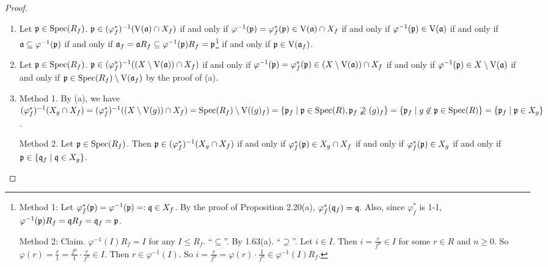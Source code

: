 \begin{proof}
    \begin{enumerate}
        \item Let $\mathfrak{p} \in \operatorname{Spec}(R_f)$. $\mathfrak{p} \in (\varphi_f^*)^{-1}(\operatorname{V}(\mathfrak{a}) \cap X_f)$ if and only if $\varphi^{-1}(\mathfrak{p}) = \varphi_f^*(\mathfrak{p}) \in \operatorname{V}(\mathfrak{a}) \cap X_f$ if and only if $\varphi^{-1}(\mathfrak{p}) \in \operatorname{V}(\mathfrak{a})$ if and only if $\mathfrak{a} \subseteq \varphi^{-1}(\mathfrak{p})$ if and only if $\mathfrak{a}_f = \mathfrak{a} R_f \subseteq \varphi^{-1}(\mathfrak{p})R_f = \mathfrak{p}$\footnote[2]{Method 1: Let $\varphi_f^*(\mathfrak{p}) = \varphi^{-1}(\mathfrak{p}) =: \mathfrak{q} \in X_f$. By the proof of Proposition 2.20(a), $\varphi_f^*(\mathfrak{q}_f) = \mathfrak{q}$. Also, since $\varphi_f^*$ is 1-1, $\varphi^{-1}(\mathfrak{p}) R_f = \mathfrak{q} R_f = \mathfrak{q}_f = \mathfrak{p}$. \par Method 2: Claim. $\varphi^{-1}(I)R_f = I$ for any $I \leq R_f$. ``$\subseteq$''. By 1.63(a). ``$\supseteq$''. Let $i \in I$. Then $i = \frac{r}{f^n} \in I$ for some $r \in R$ and $n \geq 0$. So $\varphi(r) = \frac{r}{1} = \frac{f^n}{1} \cdot \frac{r}{f^n} \in I$. Then $r \in \varphi^{-1}(I)$. So $i = \frac{r}{f^n} = \varphi(r) \cdot \frac{1}{f^n} \in \varphi^{-1}(I) R_f$.} if and only if $\mathfrak{p} \in \operatorname{V}(\mathfrak{a}_f)$.
        \item Let $\mathfrak{p} \in \operatorname{Spec}(R_f)$. $\mathfrak{p} \in (\varphi_f^*)^{-1}((X \setminus \operatorname{V}(\mathfrak{a})) \cap X_f)$ if and only if $\varphi^{-1}(\mathfrak{p}) = \varphi_f^*(\mathfrak{p}) \in (X \setminus \operatorname{V}(\mathfrak{a})) \cap X_f$ if and only if $\varphi^{-1}(\mathfrak{p}) \in X \setminus \operatorname{V}(\mathfrak{a})$ if and only if $\mathfrak{p} \in \operatorname{Spec}(R_f) \setminus \operatorname{V}(\mathfrak{a}_f)$ by the proof of (a).
        \item Method 1. By (a), we have $(\varphi^*_f)^{-1}(X_g \cap X_f) = (\varphi^*_f)^{-1}((X \setminus \operatorname{V}(g)) \cap X_f) = \operatorname{Spec}(R_f) \setminus \operatorname{V}((g)_f) = \{\mathfrak{p}_f \mid \mathfrak{p} \in \operatorname{Spec}(R), \mathfrak{p}_f \not \supseteq (g)_f\} = \{\mathfrak{p}_f \mid g \not \in \mathfrak{p} \in \operatorname{Spec}(R)\} = \{\mathfrak{p}_f \mid \mathfrak{p} \in X_g\}$. \par 
            Method 2. Let $\mathfrak{p} \in \operatorname{Spec}(R_f)$. Then $\mathfrak{p} \in (\varphi_f^*)^{-1}(X_g \cap X_f)$ if and only if $\varphi_f^*(\mathfrak{p}) \in X_g \cap X_f$ if and only if $\varphi_f^*(\mathfrak{p}) \in X_g$ if and only if $\mathfrak{p} \in \{\mathfrak{q}_f \mid \mathfrak{q} \in X_g\}$. \qedhere
    \end{enumerate}
\end{proof}

